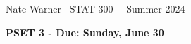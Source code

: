 \documentclass{report}
\title{\Huge{}}
\author{\huge{Nathan Warner}}
\date{\huge{}}
\begin{document}
    \pagebreak \bigbreak \noindent
    Nate Warner \ \quad \quad \quad \quad \quad \quad \quad \quad \quad \quad \quad \quad  STAT 300 \quad  \quad \quad \quad \quad \quad \quad \quad \quad \ \ \quad Summer 2024
    \begin{center}
        \textbf{PSET 3 - Due: Sunday, June 30}
    \end{center}
    \bigbreak \noindent 
\end{document}
